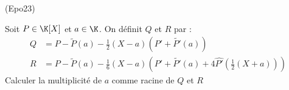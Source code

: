 \begin{tiny}(Epo23)\end{tiny} Soit $P\in \K[X]$ et $a\in \K$. On définit $Q$ et $R$ par :
\begin{align*}
 Q&= P-\widetilde{P}(a)-\frac{1}{2}(X-a)(P'+\widetilde{P'}(a))\\
 R&= P-\widetilde{P}(a)-\frac{1}{6}(X-a)(P'+\widetilde{P'}(a)+4\widehat{P'}(\frac{1}{2}(X+a)))
\end{align*}
 Calculer la multiplicité de $a$ comme racine de $Q$ et $R$